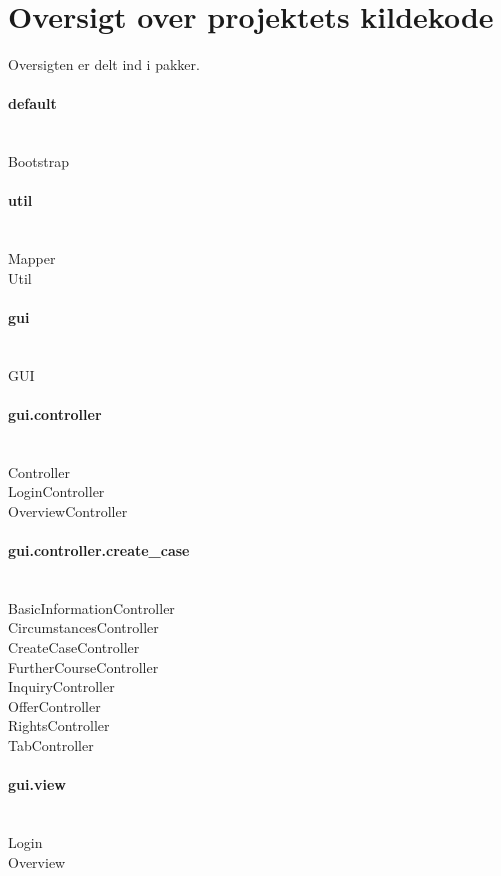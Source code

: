 \documentclass[../main.tex]{subfiles}
\begin{document}
\section{Oversigt over projektets kildekode}
Oversigten er delt ind i pakker.

\paragraph{default}\mbox{} \\
Bootstrap

\paragraph{util}\mbox{} \\
Mapper \\
Util

\paragraph{gui}\mbox{} \\
GUI

\paragraph{gui.controller}\mbox{} \\
Controller \\
LoginController \\
OverviewController

\paragraph{gui.controller.create\_case}\mbox{} \\
BasicInformationController \\
CircumstancesController \\
CreateCaseController \\
FurtherCourseController \\
InquiryController \\
OfferController \\
RightsController \\
TabController

\paragraph{gui.view}\mbox{} \\
Login \\
Overview
\end{document}
